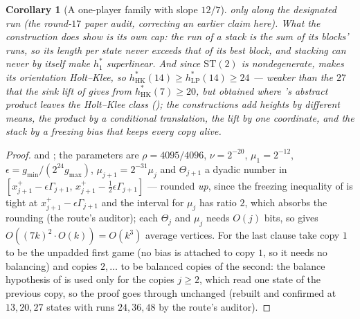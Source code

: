 \documentclass[11pt]{article}
\theoremstyle{plain}
\newtheorem{corollary}[theorem]{Corollary}
\theoremstyle{definition}
\begin{document}
\begin{corollary}[A one-player family with slope $12/7$]
only along the designated run (the round-$17$ paper audit, correcting an
earlier claim here). What the construction does show is its own cap: the
run of a stack is the sum of its blocks' runs, so its length per state
never exceeds that of its best block, and stacking can never by itself
make $h^{\ast}_{1}$ superlinear. And since
$\mathrm{ST}(2)$ is nondegenerate,  makes its
orientation Holt--Klee, so $h^{\ast}_{\mathrm{HK}}(14)\ge h^{\ast}_{\mathrm{LP}}(14)\ge24$
--- weaker than the $27$ that the sink lift of  gives
from $h^{\ast}_{\mathrm{HK}}(7)\ge20$, but obtained where
's abstract product leaves the Holt--Klee class
(); the constructions add heights by different
means, the product by a conditional translation, the lift by one
coordinate, and the stack by a freezing bias that keeps every copy alive.
\end{corollary}

\begin{proof}
 and ; the parameters are
$\rho=4095/4096$, $\nu=2^{-20}$, $\mu_1=2^{-12}$,
$\epsilon=g_{\min}/(2^{24}g_{\max})$, $\mu_{j+1}=2^{-31}\mu_j$ and $\Theta_{j+1}$ a
dyadic number in $[x^{+}_{j+1}-\epsilon\Gamma_{j+1},\,x^{+}_{j+1}-\tfrac12\epsilon\Gamma_{j+1}]$
--- rounded \emph{up}, since the freezing inequality of  is
tight at $x^{+}_{j+1}-\epsilon\Gamma_{j+1}$ and the interval for $\mu_j$ has
ratio $2$, which absorbs the rounding (the route's auditor); each $\Theta_j$ and $\mu_j$
needs $O(j)$ bits, so  gives $O((7k)^2\cdot O(k))=O(k^{3})$
average vertices. For the last clause take copy $1$ to be the unpadded first game (no
bias is attached to copy $1$, so it needs no balancing) and copies $2,\dots$ to be
balanced copies of the second: the balance hypothesis of  is used
only for the copies $j\ge2$, which read one state of the previous copy, so the
proof goes through unchanged (rebuilt and confirmed at $13,20,27$ states with
runs $24,36,48$ by the route's auditor).
\end{proof}
\end{document}
